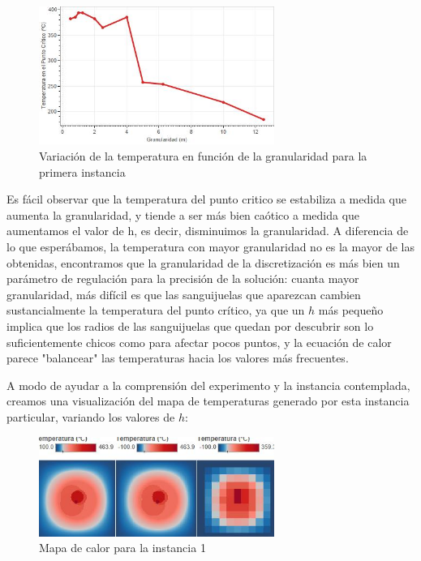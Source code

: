 \begin{figure}[h]
    \centering
    \includegraphics[width=0.685\textwidth]{experimento 1-1}
    \caption{Variación de la temperatura en función de la granularidad para la primera instancia}
    \label{fig:exp11}
\end{figure}

Es fácil observar que la temperatura del punto critico se estabiliza a medida que aumenta la granularidad, y tiende a ser más bien caótico a medida que aumentamos el valor de h, es decir, disminuimos la granularidad. A diferencia de lo que esperábamos, la temperatura con mayor granularidad no es la mayor de las obtenidas, encontramos que la granularidad de la discretización es más bien un parámetro de regulación para la precisión de la solución: cuanta mayor granularidad, más difícil es que las sanguijuelas que aparezcan cambien sustancialmente la temperatura del punto crítico, ya que un $h$ más pequeño implica que los radios de las sanguijuelas que quedan por descubrir son lo suficientemente chicos como para afectar pocos puntos, y la ecuación de calor parece "balancear" las temperaturas hacia los valores más frecuentes.

A modo de ayudar a la comprensión del experimento y la instancia contemplada, creamos una visualización del mapa de temperaturas generado por esta instancia particular, variando los valores de $h$:

\begin{figure}[h]
    \centering
    \includegraphics[width=0.685\textwidth]{Ejemplo Instancia 1}
    \caption{Mapa de calor para la instancia 1}
    \label{fig:exp11-vis}
\end{figure}

